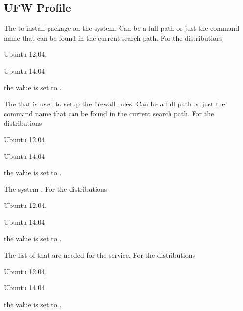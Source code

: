 \label{sec:firewall_profile}
\subsection{UFW Profile}


The  to install package on the system. Can be a full path or
just the command name that can be found in the current search path. 
For the distributions
\begin{inparaitem}
\item[\TheDistribution{ubuntu}] Ubuntu 12.04,
\item[\TheDistribution{ubuntu}] Ubuntu 14.04
\end{inparaitem}
the value is set to .


The  that is used to setup the firewall rules. Can be a full path or
just the command name that can be found in the current search path. 
For the distributions
\begin{inparaitem}
\item[\TheDistribution{ubuntu}] Ubuntu 12.04,
\item[\TheDistribution{ubuntu}] Ubuntu 14.04
\end{inparaitem}
the value is set to .


The system . 
For the distributions
\begin{inparaitem}
\item[\TheDistribution{ubuntu}] Ubuntu 12.04,
\item[\TheDistribution{ubuntu}] Ubuntu 14.04
\end{inparaitem}
the value is set to .


The list of  that are needed for the service. 
For the distributions
\begin{inparaitem}
\item[\TheDistribution{ubuntu}] Ubuntu 12.04,
\item[\TheDistribution{ubuntu}] Ubuntu 14.04
\end{inparaitem}
the value is set to .

